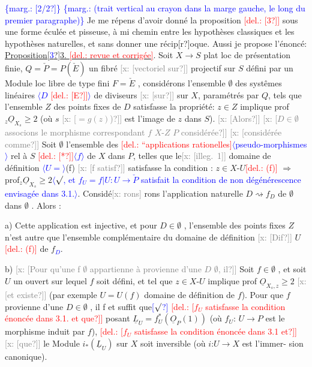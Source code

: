 \documentclass[11pt]{article}
\newcommand{\scanpage}[1]{\par\bigskip\noindent{\small\sffamily[scan #1]}\par}
\newcommand{\mspage}[1]{{\small\sffamily[p.\,#1]}}
\newcommand{\hand}[1]{\textcolor{blue}{#1}}
\let\over\relax
\newcommand{\over}[2]{\textcolor{gray}{#1}\textcolor{blue}{\ensuremath{^{\!\nearrow}}#2}}
\newcommand{\inserted}[2][]{\textcolor{blue}{$\langle$#2$\rangle$}}
\newcommand{\margin}[1]{\textcolor{blue}{\{\textsf{marg.:} #1\}}}
\newcommand{\deleted}[1]{\textcolor{red}{[\textsf{del.:} #1]}}
\newcommand{\xout}[1]{\textcolor{gray}{[\textsf{x:} #1]}}
\newcommand{\uline}[1]{\underline{#1}}
\newcommand{\unsure}[1]{[#1?]}
\newcommand{\illegible}[1]{[\textsf{illeg.\ #1}]}
\begin{document}
\mspage{\hand{118}}

\clearpage
\scanpage{25/119}
\margin{\unsure{2/2}}
\margin{(trait vertical au crayon dans la marge gauche, le long du premier paragraphe)}
Je me répens d'avoir donné la proposition \deleted{\unsure{3}} sous une forme éculée et
pisseuse, à mi chemin entre  les hypothèses classiques et les hypothèses
naturelles, et sans donner une récip\unsure{r}oque. Aussi je propose l'énoncé:
\uline{Proposition\unsure{\hand{3}}3. \deleted{revue et corrigée}}.  Soit $X \to S$ plat loc de présentation
finie,  $Q=\check{P} = P(\check{E})$  un fibré \xout{\unsure{vectoriel sur}} projectif sur $S$ défini par
un Module loc  libre de type fini $F = \check{E}$ ,  considérons l'ensemble
$\emptyset$  des systêmes linéaires \inserted{$D$ \deleted{\unsure{E}}} de diviseurs \xout{\unsure{sur}} sur $X$, paramétrés par $Q$, tels
que l'ensemble  $Z$ des points fixes de $D$  satisfasse la propriété: $z \in Z$
implique prof$_z \underline{O}_{X_s} \geqslant 2$  (où  $s$ \xout{\unsure{$= g(z)$)}} est l'image de $z$ dans $S$). \xout{\unsure{Alors}}
\xout{\unsure{$D \in \emptyset$ associons le morphisme correspondant $f$ $X$-$Z$ $P$ considérée}}
\xout{\unsure{considérée comme}}  Soit $\emptyset$ l'ensemble des  \deleted{``applications rationelles}\inserted{pseudo-morphismes} rel à
$S$ \deleted{\unsure{*}}\inserted{$f$} de $X$ dans  $P$, telles que le\xout{\illegible{1}} domaine de définition \inserted{$U=$}\over{dom}{\unsure{U}}(f)
\xout{\unsure{f satisf}} satisfasse la condition : $z \in X$-$U$\deleted{(f)} $\Longrightarrow$ prof$_z \underline{O}_{X_s} \geqslant 2$\inserted{$\surd$, et $f_U = f|U : U \to \check{P}$ satisfait la condition de non dégénérescence envisagée dans 3.1.}. Considé\xout{rons}
rons l'application naturelle  $D \rightsquigarrow f_D$  de $\emptyset$  dans $\emptyset$ .  Alors :

a)  Cette application est injective,  et  pour $D \in \emptyset$ , l'ensemble des
points fixes $Z$  n'est autre que l'ensemble  complémentaire du domaine de
définition \xout{\unsure{Dif}} $U$\deleted{(f)} de $f$\hand{$_D$}.

b)  \xout{\unsure{Pour qu'une f $\emptyset$ appartienne à provienne d'une $D$ $\emptyset$, il}} Soit
$f \in \emptyset$ , et soit $U$ un ouvert sur lequel $f$ soit défini, et tel que $z \in X$-$U$
implique prof $\underline{O}_{X_s,z} \geqslant 2$ \xout{\unsure{et existe}} (par exemple $U = U(f)$ domaine de
définition de $f$). Pour que $f$ provienne d'une $D \in \emptyset$ , il f et suffit  que\hand{\unsure{$\surd$}}
\deleted{\unsure{$f_U$ satisfasse la condition énoncée dans 3.1. et que}}
posant $\underline{L}_U = f_U^*(\underline{O}_P(1))$  (où  $f_U$: $U \to P$  est le morphisme induit par $f$),
\deleted{\unsure{$f_U$ satisfasse la condition énoncée dans 3.1 et}}
\xout{\unsure{que}} le Module  $i_*(\underline{L}_U)$  sur $X$ soit inversible (où $i$:$U \to X$ est l'immer-%
sion canonique).
\end{document}
